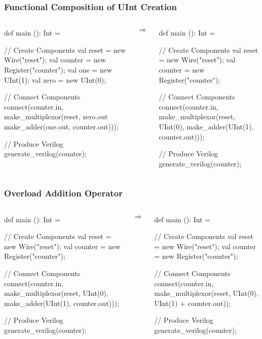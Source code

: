 \begin{frame}[fragile]
\frametitle{Functional Composition of UInt Creation}
\begin{columns}
{
\begin{scala}
def main (): Int = {
  // Create Components
  val reset   = new Wire("reset");
  val counter = new Register("counter");
  val one     = new UInt(1);
  val zero    = new UInt(0);

  // Connect Components
  connect(counter.in, 
    make_multiplexor(reset,
      zero.out
      make_adder(one.out, counter.out)));

  // Produce Verilog
  generate_verilog(counter);
}
\end{scala}
}
\begin{center}
$\Rightarrow$
\end{center}
{
\begin{scala}
def main (): Int = {
  // Create Components
  val reset   = new Wire("reset");
  val counter = new Register("counter");

  // Connect Components
  connect(counter.in, 
    make_multiplexor(reset,
      UInt(0),
      make_adder(UInt(1), counter.out)));

  // Produce Verilog
  generate_verilog(counter);
}
\end{scala}
}
\end{columns}
\end{frame}

\begin{frame}[fragile]
\frametitle{Overload Addition Operator}
\begin{columns}
{
\begin{scala}
def main (): Int = {
  // Create Components
  val reset   = new Wire("reset");
  val counter = new Register("counter");

  // Connect Components
  connect(counter.in, 
    make_multiplexor(reset,
      UInt(0),
      make_adder(UInt(1), counter.out)));

  // Produce Verilog
  generate_verilog(counter);
}
\end{scala}
}
\begin{center}
$\Rightarrow$
\end{center}
{
\begin{scala}
def main (): Int = {
  // Create Components
  val reset   = new Wire("reset");
  val counter = new Register("counter");

  // Connect Components
  connect(counter.in, 
    make_multiplexor(reset,
      UInt(0),
      UInt(1) + counter.out));

  // Produce Verilog
  generate_verilog(counter);
}
\end{scala}
}
\end{columns}
\end{frame}

